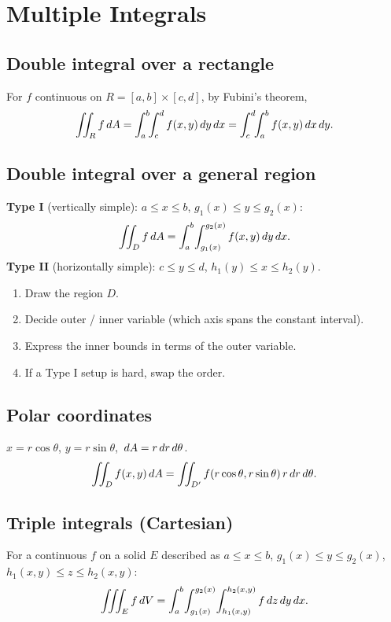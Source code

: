 \section{Multiple Integrals}

\subsection{Double integral over a rectangle}
For $f$ continuous on $R = [a,b]\times[c,d]$, by Fubini's theorem,
\[ \iint_R f \,dA = \int_a^b \!\!\int_c^d f(x,y) \,dy \,dx = \int_c^d \!\!\int_a^b f(x,y) \,dx \,dy. \]

\subsection{Double integral over a general region}
\textbf{Type I} (vertically simple): $a \le x \le b$, $g_1(x) \le y \le g_2(x)$:
\[ \iint_D f \,dA = \int_a^b \!\int_{g_1(x)}^{g_2(x)} f(x,y) \,dy \,dx. \]
\textbf{Type II} (horizontally simple): $c \le y \le d$, $h_1(y) \le x \le h_2(y)$.

\begin{keybox}[Recipe]
\begin{enumerate}[leftmargin=*,nosep]
  \item Draw the region $D$.
  \item Decide outer / inner variable (which axis spans the constant interval).
  \item Express the inner bounds in terms of the outer variable.
  \item If a Type I setup is hard, swap the order.
\end{enumerate}
\end{keybox}

\subsection{Polar coordinates}
$x = r\cos\theta$, $y = r\sin\theta$, $\,dA = r \,dr \,d\theta$.
\[ \iint_D f(x,y) \,dA = \iint_{D'} f(r\cos\theta, r\sin\theta) \, r \,dr \,d\theta. \]

\subsection{Triple integrals (Cartesian)}
For a continuous $f$ on a solid $E$ described as
$a \le x \le b$, $g_1(x) \le y \le g_2(x)$, $h_1(x,y) \le z \le h_2(x,y)$:
\[ \iiint_E f \,dV = \int_a^b \!\int_{g_1(x)}^{g_2(x)} \!\int_{h_1(x,y)}^{h_2(x,y)} f \,dz \,dy \,dx. \]

